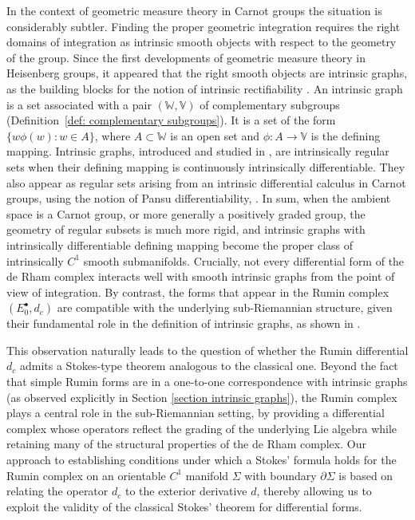 \documentclass[dvipsnames]{amsart}
\theoremstyle{definition}
\theoremstyle{definition}
\numberwithin{equation}{section}
\newcommand{\W}{\mathbb{W}}
\newcommand{\V}{\mathbb{V}}
\begin{document}
In the context of geometric measure theory in Carnot groups the situation is considerably subtler. Finding the proper geometric integration requires the
right domains of integration as intrinsic smooth objects with respect to the
geometry of the group. Since the first developments of geometric measure theory in 
Heisenberg groups, it appeared that the right smooth objects are 
intrinsic graphs, as the building blocks for the notion of intrinsic rectifiability 
\cite{FSSC01,FSSC6}. An intrinsic graph is a set associated with a pair $(\W,\V)$ of complementary subgroups (Definition~\ref{def: complementary subgroups}). It is a set of the form $\{w\phi(w):w\in A\}$, where $A\subset\W$ is an open set and $\phi:A\to\V$ is the defining mapping.
Intrinsic graphs, introduced and studied in \cite{FMS14,FranchiSerapioni}, are intrinsically regular sets when their defining mapping is continuously intrinsically differentiable. They also appear as regular sets arising from an intrinsic differential calculus in Carnot groups, using the notion of Pansu differentiability, \cite{Mag14}. In sum, when the ambient space is a Carnot group, or more generally a positively graded group, the geometry of regular subsets is much more rigid, and intrinsic graphs with intrinsically differentiable defining mapping become the proper class of intrinsically $C^1$ smooth submanifolds. 
Crucially, not every differential form of the de Rham complex interacts well with smooth intrinsic graphs from the point of view of integration. By contrast, the forms that appear in the Rumin complex $(E_0^\bullet,d_c)$ are compatible with the underlying sub-Riemannian structure, given their fundamental role in the definition of intrinsic graphs, as shown in \cite{FranchiSerapioni}. 

This observation naturally leads to the question of whether the Rumin differential $d_c$ admits a Stokes-type theorem analogous to the classical one. Beyond the fact that simple Rumin forms are in a one-to-one correspondence with intrinsic graphs (as observed explicitly in Section \ref{section intrinsic graphs}), the Rumin complex plays a central role in the sub-Riemannian setting, by providing a differential complex whose operators reflect the grading of the underlying Lie algebra while retaining many of the structural properties of the de Rham complex. Our approach to establishing conditions under which a Stokes' formula holds for the Rumin complex on an orientable $C^1$ manifold $\Sigma$ with boundary $\partial\Sigma$ is based on relating the operator $d_c$
 to the exterior derivative $d$, thereby allowing us to exploit the validity of the classical Stokes' theorem for differential forms.
\end{document}
